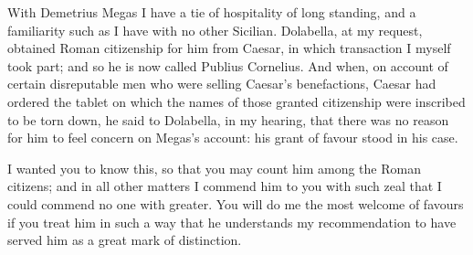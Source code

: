 

 With Demetrius Megas I have a tie of hospitality of long standing, and a familiarity such as I have with no other Sicilian. Dolabella, at my request, obtained Roman citizenship for him from Caesar, in which transaction I myself took part; and so he is now called Publius Cornelius. And when, on account of certain disreputable men who were selling Caesar's benefactions, Caesar had ordered the tablet on which the names of those granted citizenship were inscribed to be torn down, he said to Dolabella, in my hearing, that there was no reason for him to feel concern on Megas's account: his grant of favour stood in his case.

 I wanted you to know this, so that you may count him among the Roman citizens; and in all other matters I commend him to you with such zeal that I could commend no one with greater. You will do me the most welcome of favours if you treat him in such a way that he understands my recommendation to have served him as a great mark of distinction.
